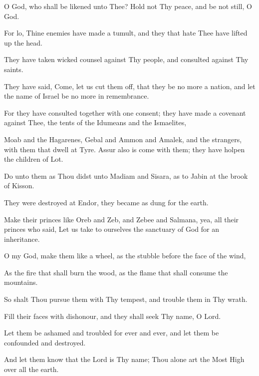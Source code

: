 O God, who shall be likened unto Thee? Hold not Thy peace, and be not still, O God.

For lo, Thine enemies have made a tumult, and they that hate Thee have lifted up the head.

They have taken wicked counsel against Thy people, and consulted against Thy saints.

They have said, Come, let us cut them off, that they be no more a nation, and let the name of Israel be no more in remembrance.

For they have consulted together with one consent; they have made a covenant against Thee, the tents of the Idumeans and the Ismaelites,

Moab and the Hagarenes, Gebal and Ammon and Amalek, and the strangers, with them that dwell at Tyre. Assur also is come with them; they have holpen the children of Lot.

Do unto them as Thou didst unto Madiam and Sisara, as to Jabin at the brook of Kisson.

They were destroyed at Endor, they became as dung for the earth.

Make their princes like Oreb and Zeb, and Zebee and Salmana, yea, all their princes who said, Let us take to ourselves the sanctuary of God for an inheritance.

O my God, make them like a wheel, as the stubble before the face of the wind,

As the fire that shall burn the wood, as the flame that shall consume the mountains.

So shalt Thou pursue them with Thy tempest, and trouble them in Thy wrath.

Fill their faces with dishonour, and they shall seek Thy name, O Lord.

Let them be ashamed and troubled for ever and ever, and let them be confounded and destroyed.

And let them know that the Lord is Thy name; Thou alone art the Most High over all the earth.
